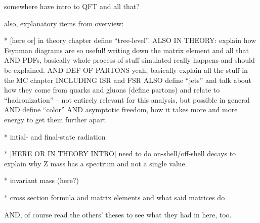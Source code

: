 somewhere have intro to QFT and all that?  

also, explanatory items from overview:

   * [here or] in theory chapter define ``tree-level''.  
ALSO IN THEORY: explain how Feynman diagrams are so useful! 
writing down the matrix element and all that
AND PDFs, basically whole process of stuff simulated 
really happens and should be explained.  
AND DEF OF PARTONS
yeah, basically explain all the stuff in the MC chapter
INCLUDING ISR and FSR
ALSO define ``jets'' and talk about how they come from 
quarks and gluons (define partons) and relate to ``hadronization'' -- 
not entirely relevant for this analysis, 
but possible in general
AND define ``color''
AND asymptotic freedom, how it takes more and more energy to get them further apart

   * intial- and final-state radiation

   * [HERE OR IN THEORY INTRO] need to do on-shell/off-shell decays 
to explain why Z mass has a spectrum and not a single value

   * invariant mass (here?)

   * cross section formula and matrix elements and what said matrices do

AND, of course read the others' theses to see what they had in here, too.  




